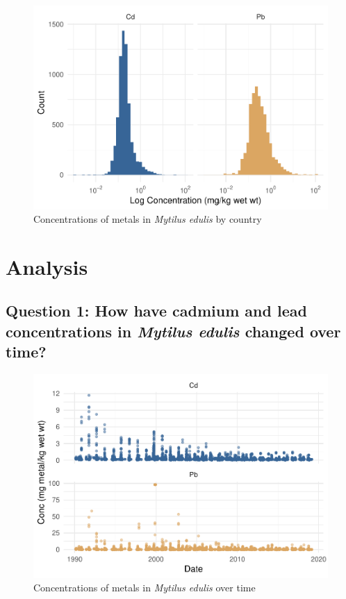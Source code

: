 \documentclass[
  12pt,
]{article}
\begin{document}
\begin{figure}
\centering
\includegraphics{McCrory_ENV972_Project_files/figure-latex/unnamed-chunk-3-1.pdf}
\caption{Concentrations of metals in \emph{Mytilus edulis} by country}
\end{figure}

\newpage

\hypertarget{analysis}{%
\section{Analysis}\label{analysis}}

\hypertarget{question-1-how-have-cadmium-and-lead-concentrations-in-mytilus-edulis-changed-over-time}{%
\subsection{\texorpdfstring{Question 1: How have cadmium and lead
concentrations in \emph{Mytilus edulis} changed over
time?}{Question 1: How have cadmium and lead concentrations in Mytilus edulis changed over time?}}\label{question-1-how-have-cadmium-and-lead-concentrations-in-mytilus-edulis-changed-over-time}}

\begin{figure}
\centering
\includegraphics{McCrory_ENV972_Project_files/figure-latex/unnamed-chunk-4-1.pdf}
\caption{Concentrations of metals in \emph{Mytilus edulis} over time}
\end{figure}
\end{document}
